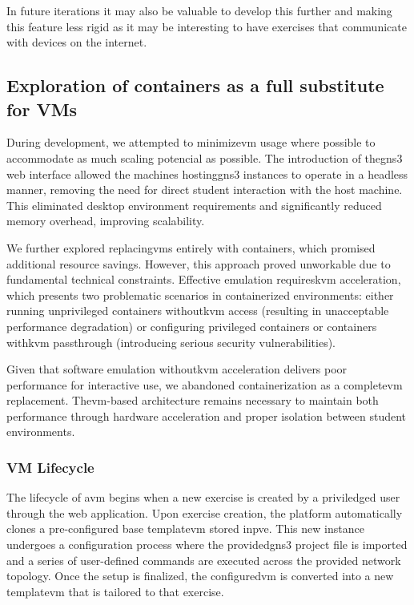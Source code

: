         In future iterations it may also be valuable to develop this further and making this feature less rigid as it may be interesting 
        to have exercises that communicate with devices on the internet.
    
    \subsection{Exploration of containers as a full substitute for VMs}

        During development, we attempted to minimize\ac{vm} usage where possible to accommodate as much scaling potencial as possible. 
        The introduction of the\ac{gns3} web interface allowed the machines hosting\ac{gns3} instances to operate in a headless manner, 
        removing the need for direct student interaction with the host machine. This eliminated desktop environment requirements and 
        significantly reduced memory overhead, improving scalability.

        We further explored replacing\ac{vm}s entirely with containers, which promised additional resource savings. However, this approach 
        proved unworkable due to fundamental technical constraints. Effective emulation requires\ac{kvm} acceleration, which presents 
        two problematic scenarios in containerized environments: either running unprivileged containers without\ac{kvm} access (resulting 
        in unacceptable performance degradation) or configuring privileged containers or containers with\ac{kvm} passthrough (introducing 
        serious security vulnerabilities).

        Given that software emulation without\ac{kvm} acceleration delivers poor performance for interactive use, we abandoned containerization 
        as a complete\ac{vm} replacement. The\ac{vm}-based architecture remains necessary to maintain both performance through hardware 
        acceleration and proper isolation between student environments.

        \subsubsection{VM Lifecycle}

            The lifecycle of a\ac{vm} begins when a new exercise is created by a priviledged user through the web application. 
            Upon exercise creation, the platform automatically clones a pre-configured base template\ac{vm} stored in\ac{pve}. This new instance 
            undergoes a configuration process where the provided\ac{gns3} project file is imported and a series of user-defined commands are executed 
            across the provided network topology. Once the setup is finalized, the configured\ac{vm} is converted into a new template\ac{vm} that 
            is tailored to that exercise.

